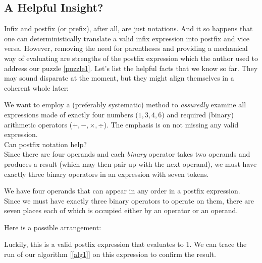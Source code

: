 \documentclass{resonance}
\newenvironment{arrangement}{\captionsetup{type=mytype}}{}
\begin{document}
\subsection{A Helpful Insight?}
Infix and postfix (or prefix), after all, are just notations. And it so happens that one can deterministically translate a valid infix expression into postfix and vice versa. 
However, removing the need for parentheses and providing a mechanical way of evaluating are strengths of the postfix expression which the author used to address our puzzle \ref{puzzle1}. Let's list the helpful facts that we know so far. They may sound disparate at the moment, but they might align themselves in a coherent whole later:
\begin{tcolorbox}
[
colback=yellow!20,
colframe=cyan,
sharp corners,
boxrule=0.5pt,
]
We want to employ a (preferably systematic) method to \emph{assuredly} examine all expressions made of exactly four numbers ($1, 3, 4, 6$) and required (binary) arithmetic operators ($+, -, \times, \div$). The emphasis is on not missing any valid expression. \\

Can postfix notation help? \\

Since there are four operands and each \emph{binary} operator takes two operands and produces a result (which may then pair up with the next operand), we must have exactly three binary operators in an expression with seven tokens.
\end{tcolorbox}

We have four operands that can appear in any order in a postfix expression. Since we must have exactly three binary operators to operate on them, there are seven places each of which is occupied either by an operator or an operand. 

Here is a possible arrangement:

\begin{arrangement}
\vspace{2mm}
\centering
{}
\label{goodperm1}
\end{arrangement}

Luckily, this is a valid postfix expression that evaluates to 1. We can trace the run of our algorithm [\ref{alg1}] on this expression to confirm the result.
\end{document}
